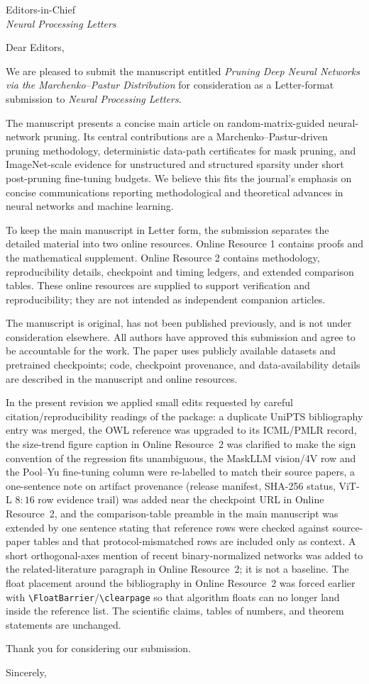 \documentclass[11pt]{letter}
\date{May 20, 2026}
\begin{document}
\begin{letter}{Editors-in-Chief\\\emph{Neural Processing Letters}}

\opening{Dear Editors,}

We are pleased to submit the manuscript entitled \emph{Pruning Deep Neural Networks via the Marchenko--Pastur Distribution} for consideration as a Letter-format submission to \emph{Neural Processing Letters}.

The manuscript presents a concise main article on random-matrix-guided neural-network pruning. Its central contributions are a Marchenko--Pastur-driven pruning methodology, deterministic data-path certificates for mask pruning, and ImageNet-scale evidence for unstructured and structured sparsity under short post-pruning fine-tuning budgets. We believe this fits the journal's emphasis on concise communications reporting methodological and theoretical advances in neural networks and machine learning.

To keep the main manuscript in Letter form, the submission separates the detailed material into two online resources. Online Resource 1 contains proofs and the mathematical supplement. Online Resource 2 contains methodology, reproducibility details, checkpoint and timing ledgers, and extended comparison tables. These online resources are supplied to support verification and reproducibility; they are not intended as independent companion articles.

The manuscript is original, has not been published previously, and is not under consideration elsewhere. All authors have approved this submission and agree to be accountable for the work. The paper uses publicly available datasets and pretrained checkpoints; code, checkpoint provenance, and data-availability details are described in the manuscript and online resources.

In the present revision we applied small edits requested by careful citation/reproducibility readings of the package: a duplicate UniPTS bibliography entry was merged, the OWL reference was upgraded to its ICML/PMLR record, the size-trend figure caption in Online Resource~2 was clarified to make the sign convention of the regression fits unambiguous, the MaskLLM vision/4V row and the Pool--Yu fine-tuning column were re-labelled to match their source papers, a one-sentence note on artifact provenance (release manifest, SHA-256 status, ViT-L \(8{:}16\) row evidence trail) was added near the checkpoint URL in Online Resource~2, and the comparison-table preamble in the main manuscript was extended by one sentence stating that reference rows were checked against source-paper tables and that protocol-mismatched rows are included only as context. A short orthogonal-axes mention of recent binary-normalized networks was added to the related-literature paragraph in Online Resource~2; it is not a baseline. The float placement around the bibliography in Online Resource~2 was forced earlier with \verb|\FloatBarrier|/\verb|\clearpage| so that algorithm floats can no longer land inside the reference list. The scientific claims, tables of numbers, and theorem statements are unchanged.

Thank you for considering our submission.

\closing{Sincerely,}

\end{letter}
\end{document}
